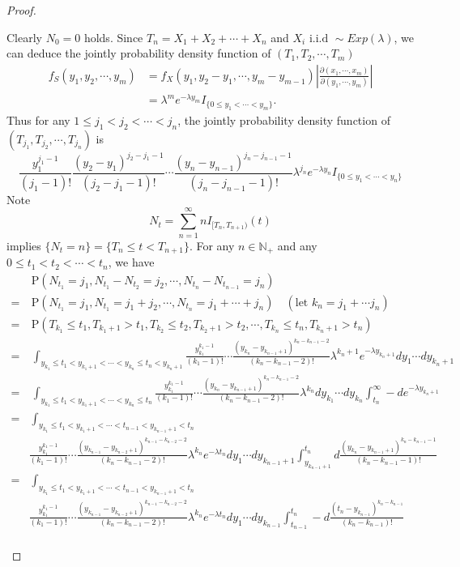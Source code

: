 \documentclass{article}
\theoremstyle{nonumberplain}
\newtheorem{proof}{Proof.}
\begin{document}
\begin{proof}
\begin{itemize}
	\noindent Clearly $N_0=0$ holds. Since $T_n=X_1+X_2+\cdots+X_n$ and $X_i\text{ i.i.d }\sim Exp(\lambda)$, we can deduce the jointly probability density function of $(T_1,T_2,\cdots,T_m)$ 
	\begin{align*}
	f_S(y_1,y_2,\cdots,y_m)&=f_X(y_1,y_2-y_1,\cdots,y_m-y_{m-1})\left|\frac{\partial(x_1,\cdots,x_m)}{\partial(y_1,\cdots,y_m)}\right|\\
	&=\lambda^m e^{-\lambda y_m}I_{\{0\le y_1<\cdots<y_m\}}.
	\end{align*}
	Thus for any $1\le j_1<j_2<\cdots<j_n$, the jointly probability density function of $(T_{j_1},T_{j_2},\cdots,T_{j_n})$ is
	\[
	\frac{y_1^{j_1-1}}{(j_1-1)!}\frac{(y_2-y_1)^{j_2-j_1-1}}{(j_2-j_1-1)!}\cdots\frac{(y_n-y_{n-1})^{j_n-j_{n-1}-1}}{(j_n-j_{n-1}-1)!}\lambda^{j_n}e^{-\lambda y_n}I_{\{0\le y_1<\cdots<y_n\}}
	\]
	Note $$N_t=\sum_{n=1}^{\infty}nI_{[T_n,T_{n+1})}(t)$$ implies $\{N_t=n\}=\{T_n\le t<T_{n+1}\}$. For any $n\in \mathbb{N}_+$ and any $0\le t_1<t_2<\cdots<t_n$, we have
	\begin{align*}
	&\ \mathrm{P}(N_{t_1}=j_1,N_{t_1}-N_{t_2}=j_2,\cdots,N_{t_{n}}-N_{t_{n-1}}=j_n)\\
	=&\ 
	\mathrm{P}(N_{t_1}=j_1,N_{t_1}=j_1+j_2,\cdots,N_{t_{n}}=j_1+\cdots+j_n)\quad(\text{let }k_n=j_1+\cdots j_n)\\
	=&\ \mathrm{P}(T_{k_1}\le t_1,T_{k_1+1}>t_1,T_{k_2}\le t_2,T_{k_2+1}>t_2,\cdots,T_{k_n}\le t_n,T_{k_n+1}>t_n)\\
	=&\ \int_{y_{k_1}\le t_1<y_{k_1+1}<\cdots<y_{k_n}\le t_n<y_{k_n+1}} \frac{y_{k_1}^{k_1-1}}{(k_1-1)!}\cdots\frac{(y_{k_n}-y_{k_{n-1}+1})^{k_n-k_{n-1}-2}}{(k_n-k_{n-1}-2)!}\lambda^{k_n+1}e^{-\lambda y_{k_n+1}}dy_1\cdots dy_{k_n+1}\\
	=&\ \int_{y_{k_1}\le t_1<y_{k_1+1}<\cdots<y_{k_n}\le t_n} \frac{y_{k_1}^{k_1-1}}{(k_1-1)!}\cdots\frac{(y_{k_n}-y_{k_{n-1}+1})^{k_n-k_{n-1}-2}}{(k_n-k_{n-1}-2)!}\lambda^{k_n}dy_{k_1}\cdots dy_{k_n}\int_{t_n}^{\infty}-de^{-\lambda y_{k_n+1}}\\
	=&\ \int_{y_{k_1}\le t_1<y_{k_1+1}<\cdots<t_{n-1}<y_{k_{n-1}+1}< t_n}\\
	&\frac{y_{k_1}^{k_1-1}}{(k_1-1)!}\cdots\frac{(y_{k_{n-1}}-y_{k_{n-2}+1})^{k_{n-1}-k_{n-2}-2}}{(k_n-k_{n-1}-2)!}\lambda^{k_n}e^{-\lambda t_n}dy_1\cdots dy_{k_{n-1}+1}\int_{y_{k_{n-1}+1}}^{t_n}d\frac{(y_{k_n}-y_{k_{n-1}+1})^{k_n-k_{n-1}-1}}{(k_n-k_{n-1}-1)!}\\
	=&\ \int_{y_{k_1}\le t_1<y_{k_1+1}<\cdots<t_{n-1}<y_{k_{n-1}+1}<t_n}\\
	&\frac{y_{k_1}^{k_1-1}}{(k_1-1)!}\cdots\frac{(y_{k_{n-1}}-y_{k_{n-2}+1})^{k_{n-1}-k_{n-2}-2}}{(k_n-k_{n-1}-2)!}\lambda^{k_n}e^{-\lambda t_n}dy_1\cdots dy_{k_{n-1}}\int_{t_{n-1}}^{t_n}-d\frac{(t_{n}-y_{k_{n-1}})^{k_n-k_{n-1}}}{(k_n-k_{n-1})!}\\

\end{align*}
\end{itemize}
\end{proof}
\end{document}
